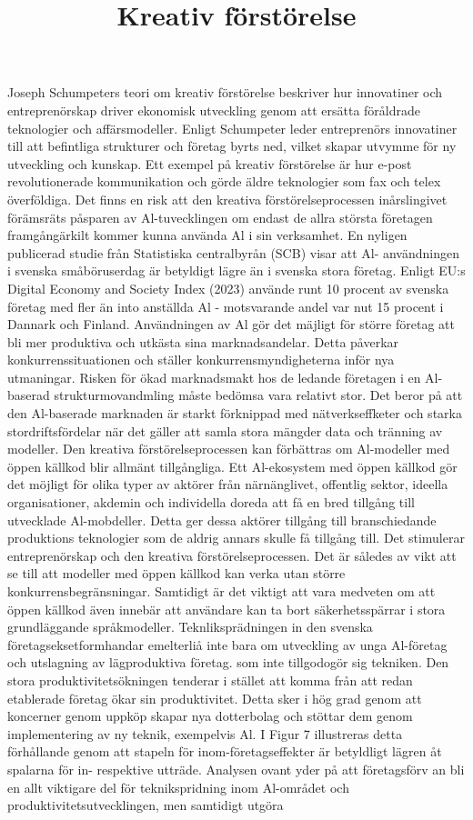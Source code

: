 {{{{{{{{\title{
Kreativ förstörelse
}
Joseph Schumpeters teori om kreativ förstörelse beskriver hur innovatiner och entreprenörskap driver ekonomisk utveckling genom att ersätta föråldrade teknologier och affärsmodeller. Enligt Schumpeter leder entreprenörs innovatiner till att befintliga strukturer och företag byrts ned, vilket skapar utvymme för ny utveckling och kunskap. Ett exempel på kreativ förstörelse är hur e-post revolutionerade kommunikation och görde äldre teknologier som fax och telex överföldiga.
Det finns en risk att den kreativa förstörelseprocessen inårslingivet förämsräts påsparen av Al-tuvecklingen om endast de allra största företagen framgångärkilt kommer kunna använda \(\mathrm{Al}\) i sin verksamhet. En nyligen publicerad studie från Statistiska centralbyrån (SCB) visar att Al- användningen i svenska småböruserdag är betyldigt lägre än i svenska stora företag. Enligt EU:s Digital Economy and Society Index (2023) använde runt 10 procent av svenska företag med fler än into anställda Al - motsvarande andel var nut 15 procent i Dannark och Finland.
Användningen av Al gör det mäjligt för större företag att bli mer produktiva och utkästa sina marknadsandelar. Detta påverkar konkurrenssituationen och ställer konkurrensmyndigheterna inför nya utmaningar. Risken för ökad marknadsmakt hos de ledande företagen i en Al-baserad strukturmovandmling måste bedömsa vara relativt stor. Det beror på att den Al-baserade marknaden är starkt förknippad med nätverkseffketer och starka stordriftsfördelar när det gäller att samla stora mängder data och tränning av modeller.
Den kreativa förstörelseprocessen kan förbättras om Al-modeller med öppen källkod blir allmänt tillgångliga. Ett Al-ekosystem med öppen källkod gör det möjligt för olika typer av aktörer från närnänglivet, offentlig sektor, ideella organisationer, akdemin och individella doreda att få en bred tillgång till utvecklade Al-mobdeller. Detta ger dessa aktörer tillgång till branschiedande produktions teknologier som de aldrig annars skulle få tillgång till. Det stimulerar entreprenörskap och den kreativa förstörelseprocessen. Det är således av vikt att se till att modeller med öppen källkod kan verka utan större konkurrensbegränsningar. Samtidigt är det viktigt att vara medveten om att öppen källkod även innebär att användare kan ta bort säkerhetsspärrar i stora grundläggande språkmodeller.
Teknliksprädningen in den svenska företagseksetformhandar emelterliå inte bara om utveckling av unga Al-företag och utslagning av lägproduktiva företag. som inte tillgodogör sig tekniken. Den stora produktivitetsökningen tenderar i stället att komma från att redan etablerade företag ökar sin produktivitet. Detta sker i hög grad genom att koncerner genom uppköp skapar nya dotterbolag och stöttar dem genom implementering av ny teknik, exempelvis Al. I Figur 7 illustreras detta förhållande genom att stapeln för inom-företagseffekter är betyldligt lägren åt spalarna för in- respektive utträde.
Analysen ovant yder på att företagsförv an bli en allt viktigare del för teknikspridning inom Al-området och produktivitetsutvecklingen, men samtidigt utgöra

}}}}}}}}
